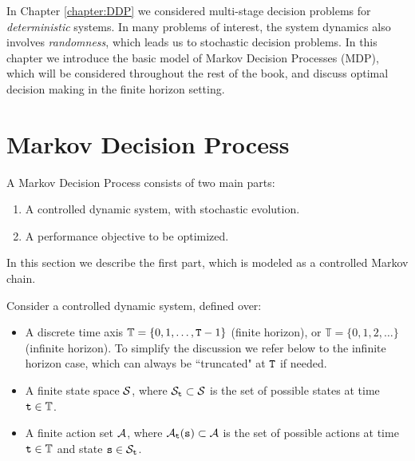 
In  Chapter \ref{chapter:DDP} we considered multi-stage decision
problems for \emph{deterministic} systems. In many problems of
interest, the system dynamics also involves \emph{randomness}, which
leads us to stochastic decision problems. In this chapter we
introduce the basic model of Markov Decision Processes (MDP), which
will be considered throughout the rest of the book, and discuss optimal decision making in the finite
horizon setting.



\section{Markov Decision Process}

A Markov Decision Process consists of two main parts:
\begin{enumerate}
  \item A controlled dynamic system, with stochastic evolution.
  \item A performance objective to be optimized.
\end{enumerate}
In this section we describe the first part, which is modeled as a controlled Markov chain.

Consider a controlled dynamic system, defined over:
\begin{itemize}
  \item A discrete time axis ${\mathbb{T}} = \{ 0,1, \ldots ,{\tt T} - 1\} $  (finite horizon), or
  ${\mathbb{T}} = \{ 0,1,2, \ldots \} $ (infinite horizon).
To simplify the discussion we refer below to the infinite horizon
case, which can always be ``truncated" at ${\tt T}$ if needed.
  \item A finite state space $\mathcal{S}$, where ${\mathcal{S}_{\tt t}} \subset \mathcal{S}$ is the set of possible states at time ${\tt t}\in {\mathbb{T}}$.
  \item A finite action set $\mathcal{A}$, where ${\mathcal{A}_{\tt t}}({\tt s}) \subset \mathcal{A}$ is the set of possible actions at time ${\tt t}\in {\mathbb{T}}$ and state ${\tt s} \in {\mathcal{S}_{\tt t}}$.
\end{itemize}

